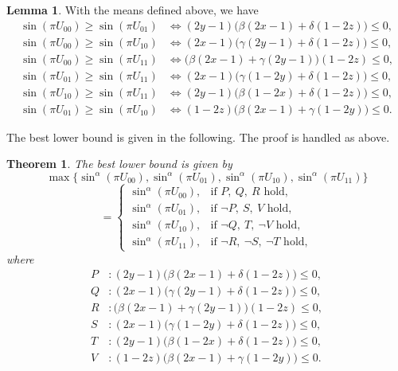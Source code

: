 \documentclass[12pt]{amsart}
\newtheorem{theorem}{Theorem}[section]
\theoremstyle{definition}
\newtheorem{lemma}{Lemma}[section]
\begin{document}
\begin{lemma}\label{lem:3d-lower-ppminus-compare}
With the means defined above, we have
\begin{align}
\sin(\pi U_{00}) \ge \sin(\pi U_{01}) &\iff (2y-1)\bigl(\beta(2x-1) + \delta(1-2z)\bigr) \le 0, \tag{i}\\
\sin(\pi U_{00}) \ge \sin(\pi U_{10}) &\iff (2x-1)\bigl(\gamma(2y-1) + \delta(1-2z)\bigr) \le 0, \tag{ii}\\
\sin(\pi U_{00}) \ge \sin(\pi U_{11}) &\iff \bigl(\beta(2x-1) + \gamma(2y-1)\bigr)(1-2z) \le 0, \tag{iii}\\
\sin(\pi U_{01}) \ge \sin(\pi U_{11}) &\iff (2x-1)\bigl(\gamma(1-2y) + \delta(1-2z)\bigr) \le 0, \tag{iv}\\
\sin(\pi U_{10}) \ge \sin(\pi U_{11}) &\iff (2y-1)\bigl(\beta(1-2x) + \delta(1-2z)\bigr) \le 0, \tag{v}\\
\sin(\pi U_{01}) \ge \sin(\pi U_{10}) &\iff (1-2z)\bigl(\beta(2x-1) + \gamma(1-2y)\bigr) \le 0. \tag{vi}
\end{align}
\end{lemma}

The best lower bound is given in the following. The proof is handled as above.

\begin{theorem}\label{thm:3d-lower-ppminus-best}
The best lower bound is given by
\[
\max\{\sin^{\alpha}(\pi U_{00}), \sin^{\alpha}(\pi U_{01}), \sin^{\alpha}(\pi U_{10}), \sin^{\alpha}(\pi U_{11})\}
\]
\[
=
\begin{cases}
\sin^{\alpha}(\pi U_{00}), & \text{if } P,\ Q,\ R \text{ hold},\\
\sin^{\alpha}(\pi U_{01}), & \text{if } \neg P,\ S,\ V \text{ hold},\\
\sin^{\alpha}(\pi U_{10}), & \text{if } \neg Q,\ T,\ \neg V \text{ hold},\\
\sin^{\alpha}(\pi U_{11}), & \text{if } \neg R,\ \neg S,\ \neg T \text{ hold},
\end{cases}
\]
where
\begin{align*}
P &: (2y-1)\bigl(\beta(2x-1) + \delta(1-2z)\bigr) \le 0, \\
Q &: (2x-1)\bigl(\gamma(2y-1) + \delta(1-2z)\bigr) \le 0, \\
R &: \bigl(\beta(2x-1) + \gamma(2y-1)\bigr)(1-2z) \le 0, \\
S &: (2x-1)\bigl(\gamma(1-2y) + \delta(1-2z)\bigr) \le 0, \\
T &: (2y-1)\bigl(\beta(1-2x) + \delta(1-2z)\bigr) \le 0, \\
V &: (1-2z)\bigl(\beta(2x-1) + \gamma(1-2y)\bigr) \le 0.
\end{align*}
\end{theorem}
\end{document}
